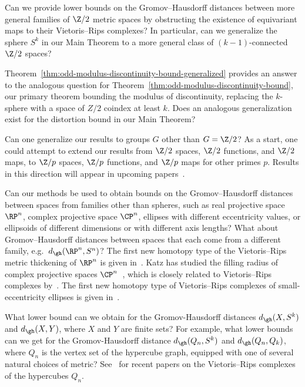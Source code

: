 \documentclass[11pt, reqno, english]{amsart}
\begin{document}
\begin{question}
\label{ques:GH-equivariance-Z/2}
Can we provide lower bounds on the Gromov--Hausdorff distances between more general families of $\Z/2$ metric spaces by obstructing the existence of equivariant maps to their Vietoris--Rips complexes?
In particular, can we generalize the sphere $S^{k}$ in our Main Theorem to a more general class of $(k - 1)$-connected $\Z/2$ spaces?

Theorem~\ref{thm:odd-modulus-discontinuity-bound-generalized} provides an answer to the analogous question for Theorem~\ref{thm:odd-modulus-discontinuity-bound}, our primary theorem bounding the modulus of discontinuity, replacing the $k$-sphere with a space of $Z/2$ coindex at least $k$.
Does an analogous generalization exist for 
the distortion bound in our Main Theorem?
\end{question}

\begin{question}
\label{ques:GH-equivariance-otherGroups}
Can one generalize our results to groups $G$ other than $G = \Z/2$?
As a start, one could attempt to extend our results from $\Z/2$ spaces, $\Z/2$ functions, and $\Z/2$ maps, to $\Z/p$ spaces, $\Z/p$ functions, and $\Z/p$ maps for other primes $p$.
Results in this direction will appear in upcoming papers~\cite{adams2022quantifying,lim2022GGHdist}.
\end{question}

\begin{question}
\label{ques:GH-projective}
Can our methods be used to obtain bounds on the Gromov--Hausdorff distances between spaces from families other than spheres, such as real projective space $\RP^n$, complex projective space $\CP^n$, ellipses with different eccentricity values, or ellipsoids of different dimensions or with different axis lengths?
What about Gromov--Hausdorff distances between spaces that each come from a different family, e.g.\ $d_\gh(\RP^n, S^n)$?
The first new homotopy type of the Vietoris--Rips metric thickening of $\RP^n$ is given in~\cite{AdamsHeimPeterson}.
Katz has studied the filling radius of complex projective spaces $\CP^n$~\cite{katz1983filling,katz9filling,katz1991neighborhoods,katz1991rational}, which is closely related to Vietoris--Rips complexes by~\cite{lim2020vietoris}.
The first new homotopy type of Vietoris--Rips complexes of small-eccentricity ellipses is given in~\cite{AAR}.
\end{question}

\begin{question}
\label{ques:finite}
What lower bound can we obtain for the Gromov-Hausdorff distances $d_{\gh}(X,S^k)$ and $d_{\gh}(X,Y)$, where $X$ and $Y$ are finite sets?
For example, what lower bounds can we get for the Gromov-Hausdorff distance $d_{\gh}(Q_n,S^k)$ and $d_\gh(Q_n,Q_k)$, where $Q_n$ is the vertex set of the hypercube graph, equipped with one of several natural choices of metric?
See~\cite{carlsson2020persistent,adamaszek2021vietoris,shukla2022vietoris} for recent papers on the Vietoris--Rips complexes of the hypercubes $Q_n$.
\end{question}
\end{document}
